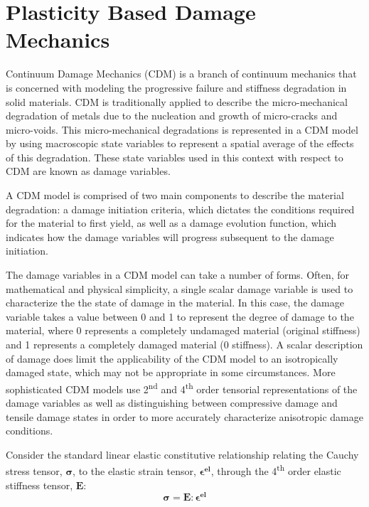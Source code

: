 \section{Plasticity Based Damage Mechanics}

Continuum Damage Mechanics (CDM) is a branch of continuum mechanics that is concerned with modeling the progressive failure and stiffness degradation in solid materials. CDM is traditionally applied to describe the micro-mechanical degradation of metals due to the nucleation and growth of micro-cracks and micro-voids. This micro-mechanical degradations is represented in a CDM model by using macroscopic state variables to represent a spatial average of the effects of this degradation. These state variables used in this context with respect to CDM are known as damage variables. 

A CDM model is comprised of two main components to describe the material degradation: a damage initiation criteria, which dictates the conditions required for the material to first yield, as well as a damage evolution function, which indicates how the damage variables will progress subsequent to the damage initiation. 

The damage variables in a CDM model can take a number of forms. Often, for mathematical and physical simplicity, a single scalar damage variable is used to characterize the the state of damage in the material. In this case, the damage variable takes a value between 0 and 1 to represent the degree of damage to the material, where 0 represents a completely undamaged material (original stiffness) and 1 represents a completely damaged material (0 stiffness). A scalar description of damage does limit the applicability of the CDM model to an isotropically damaged state, which may not be appropriate in some circumstances. More sophisticated CDM models use 2\textsuperscript{nd} and 4\textsuperscript{th} order tensorial representations of the damage variables as well as distinguishing between compressive damage and tensile damage states in order to more accurately characterize anisotropic damage conditions. 

Consider the standard linear elastic constitutive relationship relating the Cauchy stress tensor, $\boldsymbol{\sigma}$, to the elastic strain tensor, $\boldsymbol{\epsilon^{el}}$, through the 4\textsuperscript{th} order elastic stiffness tensor, $\mathbf{E}$:
\begin{equation}
\boldsymbol{\sigma}=\mathbf{E}:\boldsymbol{\epsilon^{el}}\label{eqn:const3a}
\end{equation}

